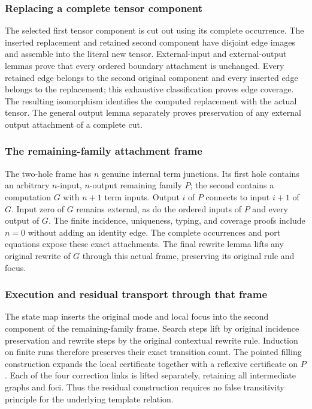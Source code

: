 \subsubsection{Replacing a complete tensor component}
The selected first tensor component is cut out using its complete occurrence.  The inserted replacement and retained second component have disjoint edge images and assemble into the literal new tensor.  External-input and external-output lemmas prove that every ordered boundary attachment is unchanged.  Every retained edge belongs to the second original component and every inserted edge belongs to the replacement; this exhaustive classification proves edge coverage.  The resulting isomorphism identifies the computed replacement with the actual tensor.  The general output lemma separately proves preservation of any external output attachment of a complete cut.

\subsubsection{The remaining-family attachment frame}
The two-hole frame has $n$ genuine internal term junctions.  Its first hole contains an arbitrary $n$-input, $n$-output remaining family $P$; the second contains a computation $G$ with $n+1$ term inputs.  Output $i$ of $P$ connects to input $i+1$ of $G$.  Input zero of $G$ remains external, as do the ordered inputs of $P$ and every output of $G$.  The finite incidence, uniqueness, typing, and coverage proofs include $n=0$ without adding an identity edge.  The complete occurrences and port equations expose these exact attachments.  The final rewrite lemma lifts any original rewrite of $G$ through this actual frame, preserving its original rule and focus.

\subsubsection{Execution and residual transport through that frame}
The state map inserts the original mode and local focus into the second component of the remaining-family frame.  Search steps lift by original incidence preservation and rewrite steps by the original contextual rewrite rule.  Induction on finite runs therefore preserves their exact transition count.  The pointed filling construction expands the local certificate together with a reflexive certificate on $P$.  Each of the four correction links is lifted separately, retaining all intermediate graphs and foci.  Thus the residual construction requires no false transitivity principle for the underlying template relation.

